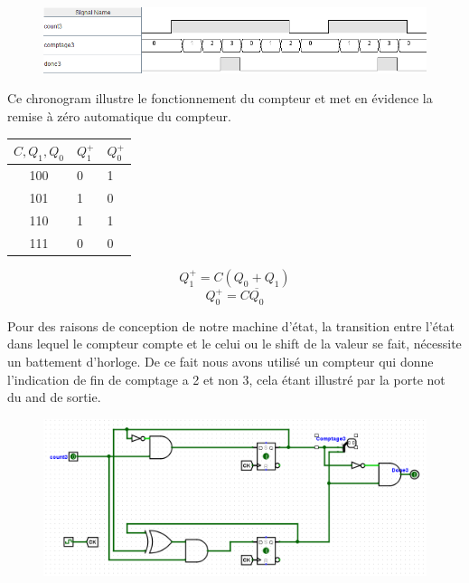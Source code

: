 \documentclass[a4paper]{article} %
\begin{document}
\begin{tcolorbox}[colframe=Monokaimagenta,colback=white, breakable, enhanced]
\begin{figure}[H]
	\centering
	\includegraphics[width=\textwidth]{src/chrono_CPT3_1}
	\label{fig:chrono_CPT_03_1}
\end{figure}
Ce chronogram illustre le fonctionnement du compteur et met en évidence la remise à zéro automatique du compteur.


\begin{multicols}{2}
	\begin{tabular}{c|l l}
		$C,Q_1,Q_0$ & $Q_1^+$& $Q_0^+$ \\
		\hline
		100	&	0&1\\
		101	&	1&0\\
		110	&	1&1\\
		111	&	0&0\\
	\end{tabular}
	

	\begin{equation*}
	Q_1^+ = C(Q_0 + Q_1)
	\end{equation*}
		\begin{equation*}
			Q_0^+ = C\overline{Q_0}
		\end{equation*}

\end{multicols}
Pour des raisons de conception de notre machine d'état, la transition entre l'état dans lequel le compteur compte et le celui ou le shift de la valeur se fait, nécessite un battement d'horloge. De ce fait nous avons utilisé un compteur qui donne l'indication de fin de comptage a 2 et non 3, cela étant illustré par la porte not du and de sortie.
\begin{figure}[H]
	\centering
	\includegraphics[width=\textwidth]{src/CPT_03_2}
	\label{fig:CPT_03_2}
\end{figure}
\end{tcolorbox}
\end{document}
